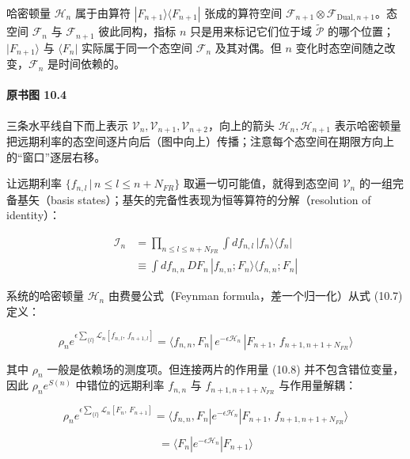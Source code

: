 哈密顿量 $\mathcal{H}_n$ 属于由算符 $|F_{n+1}\rangle\langle F_{n+1}|$ 张成的算符空间 $\mathcal{F}_{n+1}\otimes\mathcal{F}_{\text{Dual},n+1}$。态空间 $\mathcal{F}_n$ 与 $\mathcal{F}_{n+1}$ 彼此同构，指标 $n$ 只是用来标记它们位于域 $\widetilde{\mathcal{P}}$ 的哪个位置；$|F_{n+1}\rangle$ 与 $\langle F_n|$ 实际属于同一个态空间 $\mathcal{F}_n$ 及其对偶。但 $n$ 变化时态空间随之改变，$\mathcal{F}_n$ 是时间依赖的。

\paragraph{原书图 10.4}\quad 三条水平线自下而上表示 $\mathcal{V}_n,\mathcal{V}_{n+1},\mathcal{V}_{n+2}$，向上的箭头 $\mathcal{H}_n,\mathcal{H}_{n+1}$ 表示哈密顿量把远期利率的态空间逐片向后（图中向上）传播；注意每个态空间在期限方向上的“窗口”逐层右移。

让远期利率 $\{f_{n,l}\,|\,n\le l\le n+N_{FR}\}$ 取遍一切可能值，就得到态空间 $\mathcal{V}_n$ 的一组完备基矢（basis states）；基矢的完备性表现为恒等算符的分解（resolution of identity）：

\begin{equation*}
\begin{aligned}
\mathcal{I}_n&=\prod_{n\le l\le n+N_{FR}}\int df_{n,l}\,|f_n\rangle\langle f_n|\\
&\equiv\int df_{n,n}\,DF_n\,|f_{n,n};F_n\rangle\langle f_{n,n};F_n|
\end{aligned}
\tag{10.10}
\end{equation*}

系统的哈密顿量 $\mathcal{H}_n$ 由费曼公式（Feynman formula，差一个归一化）从式 (10.7) 定义：

\begin{equation*}
\rho_n e^{\epsilon\sum_{\{l\}}\mathcal{L}_n[f_{n,l},\,f_{n+1,l}]}
=\langle f_{n,n},F_n|\,e^{-\epsilon\mathcal{H}_n}\,|F_{n+1},\,f_{n+1,n+1+N_{FR}}\rangle
\tag{10.11}
\end{equation*}

其中 $\rho_n$ 一般是依赖场的测度项。但连接两片的作用量 (10.8) 并不包含错位变量，因此 $\rho_n e^{S(n)}$ 中错位的远期利率 $f_{n,n}$ 与 $f_{n+1,n+1+N_{FR}}$ 与作用量解耦：

\begin{equation*}
\rho_n e^{\epsilon\sum_{\{l\}}\mathcal{L}_n[F_n,\,F_{n+1}]}
=\langle f_{n,n},F_n|e^{-\epsilon\mathcal{H}_n}|F_{n+1},\,f_{n+1,n+1+N_{FR}}\rangle
\tag{10.12}
\end{equation*}

\begin{equation*}
=\langle F_n|e^{-\epsilon\mathcal{H}_n}|F_{n+1}\rangle
\tag{10.13}
\end{equation*}

